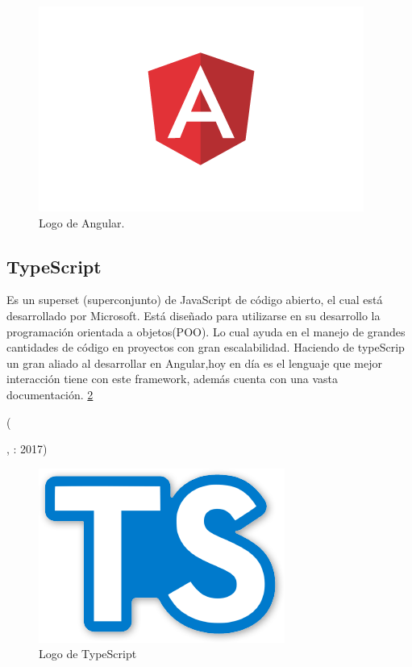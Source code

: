 \begin{figure}[h]
  \label{figura9}
  \centering
  \includegraphics[scale=.70]{lib/assets/9}
  \caption{Logo de Angular.}
\end{figure}

\subsection{TypeScript}

\begin{center}
  \begin{minipage}{0.9\linewidth}
    \vspace{5pt}%
    {\small
    Es un superset (superconjunto) de JavaScript de código abierto, el cual está desarrollado por Microsoft. Está diseñado para utilizarse en su desarrollo la programación orientada a objetos(POO). Lo cual ayuda en el manejo de grandes cantidades de código en proyectos con gran escalabilidad. Haciendo de typeScrip un gran aliado al desarrollar en Angular,hoy en día es el lenguaje que mejor interacción tiene con este framework, además cuenta con una vasta documentación. \ref{figura10}
    }
    \begin{flushright}
      (\author{¿Qué es TypeScript?.},
      : 2017)
    \end{flushright}
      \vspace{5pt}%
  \end{minipage}
\end{center}

\begin{figure}[h]
  \label{figura10}
  \centering
  \includegraphics[scale=.35]{lib/assets/10}
  \caption{Logo de TypeScript}
\end{figure}



